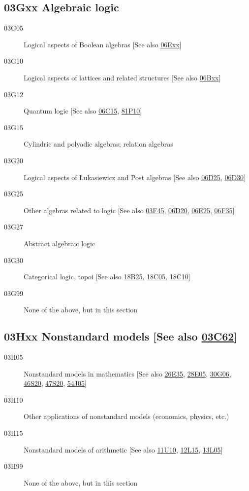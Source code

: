 \documentclass[letterpaper]{article}
\begin{document}
\subsection*{03Gxx  Algebraic logic }\label{03Gxx}
\begin{description}
\item [03G05]\label{03G05} Logical aspects of Boolean algebras [See also \hyperref[06Exx]{06Exx}]
\item [03G10]\label{03G10} Logical aspects of lattices and related structures [See also \hyperref[06Bxx]{06Bxx}]
\item [03G12]\label{03G12} Quantum logic [See also \hyperref[06C15]{06C15}, \hyperref[81P10]{81P10}]
\item [03G15]\label{03G15} Cylindric and polyadic algebras; relation algebras
\item [03G20]\label{03G20} Logical aspects of \L ukasiewicz and Post algebras [See also \hyperref[06D25]{06D25}, \hyperref[06D30]{06D30}]
\item [03G25]\label{03G25} Other algebras related to logic [See also \hyperref[03F45]{03F45}, \hyperref[06D20]{06D20}, \hyperref[06E25]{06E25}, \hyperref[06F35]{06F35}]
\item [03G27]\label{03G27} Abstract algebraic logic
\item [03G30]\label{03G30} Categorical logic, topoi [See also \hyperref[18B25]{18B25}, \hyperref[18C05]{18C05}, \hyperref[18C10]{18C10}]
\item [03G99]\label{03G99} None of the above, but in this section
\end{description}
\subsection*{03Hxx  Nonstandard models [See also \hyperref[03C62]{03C62}] }\label{03Hxx}
\begin{description}
\item [03H05]\label{03H05} Nonstandard models in mathematics [See also \hyperref[26E35]{26E35}, \hyperref[28E05]{28E05}, \hyperref[30G06]{30G06}, \hyperref[46S20]{46S20}, \hyperref[47S20]{47S20}, \hyperref[54J05]{54J05}]
\item [03H10]\label{03H10} Other applications of nonstandard models (economics, physics, etc.)
\item [03H15]\label{03H15} Nonstandard models of arithmetic [See also \hyperref[11U10]{11U10}, \hyperref[12L15]{12L15}, \hyperref[13L05]{13L05}]
\item [03H99]\label{03H99} None of the above, but in this section
\end{description}
\end{document}
